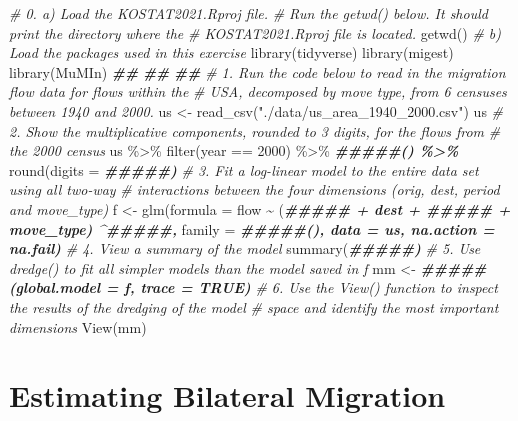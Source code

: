 \documentclass[
]{book}
\newenvironment{Shaded}{\begin{snugshade}}{\end{snugshade}}
\newcommand{\AttributeTok}[1]{\textcolor[rgb]{0.77,0.63,0.00}{#1}}
\newcommand{\CommentTok}[1]{\textcolor[rgb]{0.56,0.35,0.01}{\textit{#1}}}
\newcommand{\DecValTok}[1]{\textcolor[rgb]{0.00,0.00,0.81}{#1}}
\newcommand{\DocumentationTok}[1]{\textcolor[rgb]{0.56,0.35,0.01}{\textbf{\textit{#1}}}}
\newcommand{\FunctionTok}[1]{\textcolor[rgb]{0.00,0.00,0.00}{#1}}
\newcommand{\NormalTok}[1]{#1}
\newcommand{\OtherTok}[1]{\textcolor[rgb]{0.56,0.35,0.01}{#1}}
\newcommand{\SpecialCharTok}[1]{\textcolor[rgb]{0.00,0.00,0.00}{#1}}
\newcommand{\StringTok}[1]{\textcolor[rgb]{0.31,0.60,0.02}{#1}}
\begin{document}
\begin{Shaded}
\begin{Highlighting}[]
\CommentTok{\# 0.  a) Load the KOSTAT2021.Rproj file. }
\CommentTok{\#     Run the getwd() below. It should print the directory where the }
\CommentTok{\#     KOSTAT2021.Rproj file is located.}
\FunctionTok{getwd}\NormalTok{()}
\CommentTok{\#     b) Load the packages used in this exercise}
\FunctionTok{library}\NormalTok{(tidyverse)}
\FunctionTok{library}\NormalTok{(migest)}
\FunctionTok{library}\NormalTok{(MuMIn)}
\DocumentationTok{\#\#}
\DocumentationTok{\#\#}
\DocumentationTok{\#\#}
\CommentTok{\# 1. Run the code below to read in the migration flow data for flows within the }
\CommentTok{\#    USA, decomposed by move type, from 6 censuses between 1940 and 2000. }
\NormalTok{us }\OtherTok{\textless{}{-}} \FunctionTok{read\_csv}\NormalTok{(}\StringTok{"./data/us\_area\_1940\_2000.csv"}\NormalTok{)}
\NormalTok{us}
\CommentTok{\# 2. Show the multiplicative components, rounded to 3 digits, for the flows from}
\CommentTok{\#    the 2000 census}
\NormalTok{us }\SpecialCharTok{\%\textgreater{}\%}
  \FunctionTok{filter}\NormalTok{(year }\SpecialCharTok{==} \DecValTok{2000}\NormalTok{) }\SpecialCharTok{\%\textgreater{}\%}
  \DocumentationTok{\#\#\#\#\#() \%\textgreater{}\%}
  \FunctionTok{round}\NormalTok{(}\AttributeTok{digits =} \DocumentationTok{\#\#\#\#\#)}
\CommentTok{\# 3. Fit a log{-}linear model to the entire data set using all two{-}way }
\CommentTok{\#    interactions between the four dimensions (orig, dest, period and move\_type)}
\NormalTok{f }\OtherTok{\textless{}{-}} \FunctionTok{glm}\NormalTok{(}\AttributeTok{formula =}\NormalTok{ flow }\SpecialCharTok{\textasciitilde{}}\NormalTok{ (}\DocumentationTok{\#\#\#\#\# + dest + \#\#\#\#\# + move\_type) \^{}\#\#\#\#\#,}
         \AttributeTok{family =} \DocumentationTok{\#\#\#\#\#(), data = us, na.action = na.fail)}
\CommentTok{\# 4. View a summary of the model }
\FunctionTok{summary}\NormalTok{(}\DocumentationTok{\#\#\#\#\#)}
\CommentTok{\# 5. Use dredge() to fit all simpler models than the model saved in f}
\NormalTok{mm }\OtherTok{\textless{}{-}} \DocumentationTok{\#\#\#\#\#(global.model = f, trace = TRUE)}
\CommentTok{\# 6. Use the View() function to inspect the results of the dredging of the model }
\CommentTok{\#    space and identify the most important dimensions}
\FunctionTok{View}\NormalTok{(mm)}
\end{Highlighting}
\end{Shaded}

\hypertarget{estimating-bilateral-migration}{%
\chapter{Estimating Bilateral Migration}\label{estimating-bilateral-migration}}
\end{document}
